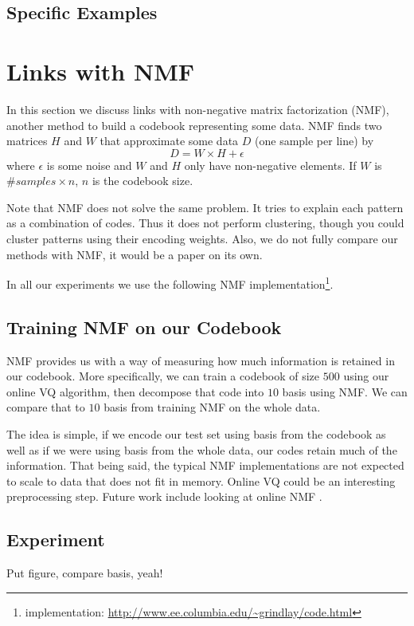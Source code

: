 \documentclass{article}
\begin{document}
\subsection{Specific Examples}


\section{Links with NMF}\label{sec:nmf}
In this section we discuss links with non-negative matrix factorization
\cite{Lee2000} (NMF), another method to build a codebook representing some data.
NMF finds two matrices $H$ and $W$ that approximate some data $D$ (one
sample per line) by
\[
D = W \times H + \epsilon
\]
where $\epsilon$ is some noise and $W$ and $H$ only have non-negative 
elements. If $W$ is $\#samples \times n$, $n$ is the codebook size.

Note that NMF does not solve the same problem. It tries to explain each pattern
as a combination of codes. Thus it does not perform clustering, though you
could cluster patterns using their encoding weights. Also, we do not fully
compare our methods with NMF, it would be a paper on its own.

In all our experiments we use the following NMF
implementation\footnote{implementation: \url{http://www.ee.columbia.edu/~grindlay/code.html}}.

\subsection{Training NMF on our Codebook}
NMF provides us with a way of measuring how much information is retained
in our codebook. More specifically, we can train a codebook of size $500$
using our online VQ algorithm, then decompose that code into $10$ basis
using NMF. We can compare that to $10$ basis from training NMF on the
whole data.

The idea is simple, if we encode our test set using basis from the
codebook as well as if we were using basis from the whole data, our codes
retain much of the information. That being said, the typical NMF implementations
are not expected to scale to data that does not fit in memory. Online VQ
could be an interesting preprocessing step. Future work include looking
at online NMF \cite{Thurau2009}.

\subsection{Experiment}
Put figure, compare basis, yeah!
\end{document}
